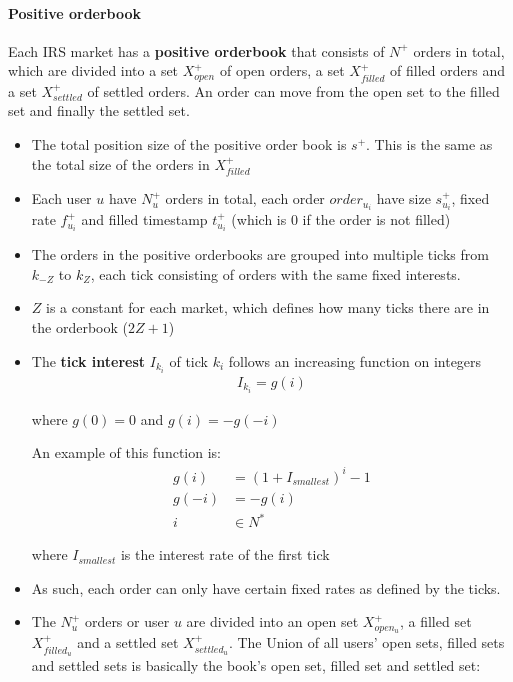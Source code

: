 \documentclass{article}%
\begin{document}
\paragraph{Positive orderbook} Each IRS market has a \textbf{positive orderbook} that consists of $N^{+}$  orders in total, which are divided into a set $X_{open}^{+}$ of open orders, a set $X_{filled}^{+}$ of filled orders and a set $X_{settled}^{+}$ of settled orders. An order can move from the open set to the filled set and finally the settled set.
\begin{itemize}
    \item The total position size of the positive order book is $s^+$. This is the same as the total size of the orders in $X_{filled}^{+}$
    \item Each user $u$ have $N_u^{+}$ orders in total, each order $order_{u_i}$ have size $s_{u_i}^{+}$, fixed rate $f_{u_i}^{+}$ and filled timestamp $t_{u_i}^{+}$ (which is 0 if the order is not filled)
    \item The orders in the positive orderbooks are grouped into multiple ticks from  $k_{-Z}$ to $k_{Z}$, each tick consisting of orders with the same fixed interests.
    \item $Z$ is a constant for each market, which defines how many ticks there are in the orderbook ($2Z + 1$)
    \item The \textbf{tick interest} $I_{k_{i}}$ of tick $k_{i}$ follows an increasing function on integers
        \begin{align*}
            I_{k_{i}} = g(i)
        \end{align*}  
        \begin{center}
            where $g(0) = 0$ and $g(i) = -g(-i)$
        \end{center}
    An example of this function is:
        \begin{align*}
            g(i) &= (1+I_{smallest})^i-1\\
            g(-i) &= -g(i)\\
            i &\in N^*
        \end{align*}
        \begin{center}
            where $I_{smallest}$ is the interest rate of the first tick
        \end{center}
    \item As such, each order can only have certain fixed rates as defined by the ticks.
    \item The $N_u^{+}$ orders or user $u$ are divided into an open set $X_{open_{u}}^{+}$, a filled set $X_{filled_{u}}^{+}$ and a settled set $X_{settled_{u}}^{+}$. The Union of all users' open sets, filled sets and settled sets is basically the book's open set, filled set and settled set:

\end{itemize}
\end{document}
